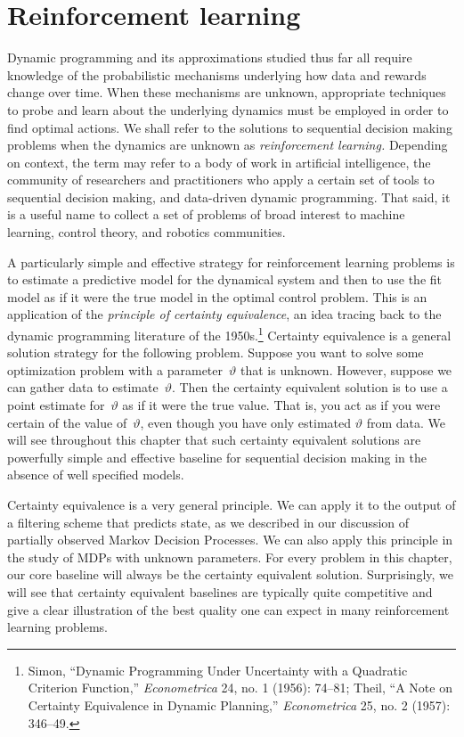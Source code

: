 \documentclass{tufte-book}
\begin{document}
\chapter{Reinforcement learning}

Dynamic programming and its approximations studied thus far all require
knowledge of the probabilistic mechanisms underlying how data and
rewards change over time. When these mechanisms are unknown, appropriate
techniques to probe and learn about the underlying dynamics must be
employed in order to find optimal actions. We shall refer to the
solutions to sequential decision making problems when the dynamics are
unknown as \emph{reinforcement learning.}
Depending on context, the term may refer to a body of work in artificial
intelligence, the community of researchers and practitioners who apply a
certain set of tools to sequential decision making, and data-driven
dynamic programming. That said, it is a useful name to collect a set of
problems of broad interest to machine learning, control theory, and
robotics communities.

A particularly simple and effective strategy for reinforcement learning
problems is to estimate a predictive model for the dynamical system and
then to use the fit model as if it were the true model in the optimal
control problem. This is an application of the \emph{principle of
certainty equivalence}, an idea tracing back to the dynamic programming
literature of the 1950s.\footnote{Simon, {``Dynamic Programming Under
  Uncertainty with a Quadratic Criterion Function,''}
  \emph{Econometrica} 24, no. 1 (1956): 74--81; Theil, {``A Note on
  Certainty Equivalence in Dynamic Planning,''} \emph{Econometrica} 25,
  no. 2 (1957): 346--49.} Certainty equivalence is a general solution
strategy for the following problem. Suppose you want to solve some
optimization problem with a parameter~\(\vartheta\) that is unknown.
However, suppose we can gather data to estimate~\(\vartheta\). Then the
certainty equivalent solution is to use a point estimate
for~\(\vartheta\) as if it were the true value. That is, you act as if
you were certain of the value of~\(\vartheta\), even though you have
only estimated \(\vartheta\) from data. We will see throughout this
chapter that such certainty equivalent solutions are powerfully simple
and effective baseline for sequential decision making in the absence of
well specified models.

Certainty equivalence is a very general principle. We can apply it to
the output of a filtering scheme that predicts state, as we described in
our discussion of partially observed Markov Decision Processes. We can
also apply this principle in the study of MDPs with unknown parameters.
For every problem in this chapter, our core baseline will always be the
certainty equivalent solution. Surprisingly, we will see that certainty
equivalent baselines are typically quite competitive and give a clear
illustration of the best quality one can expect in many reinforcement
learning problems.
\end{document}
